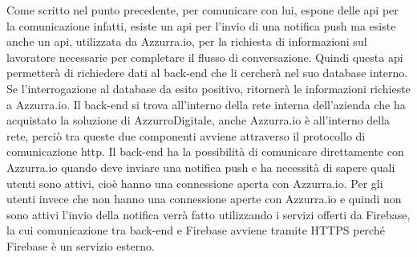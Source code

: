 \begin{trivlist}
	Come scritto nel punto precedente, per comunicare con lui, espone delle \gls{api}\ap{[g]} per la comunicazione infatti, esiste un \gls{api}\ap{[g]} per l'invio di una \gls{notifica push}\ap{[g]} ma esiste anche un \gls{api}\ap{[g]}, utilizzata da Azzurra.io, per la richiesta di informazioni sul lavoratore necessarie per completare il flusso di conversazione. Quindi questa \gls{api}\ap{[g]} permetterà di richiedere dati al back-end che li cercherà nel suo database interno. Se l'interrogazione al database da esito positivo, ritornerà le informazioni richieste a Azzurra.io. Il back-end si trova all'interno della rete interna dell'azienda che ha acquistato la soluzione di AzzurroDigitale, anche Azzurra.io è all'interno della rete, perciò tra queste due componenti avviene attraverso il protocollo di comunicazione \gls{http}\ap{[g]}\glsfirstoccur. Il back-end ha la possibilità di comunicare direttamente con Azzurra.io quando deve inviare una \gls{notifica push}\ap{[g]} e ha necessità di sapere quali utenti sono attivi, cioè hanno una connessione aperta con Azzurra.io. Per gli utenti invece che non hanno una connessione aperte con Azzurra.io e quindi non sono attivi l'invio della notifica verrà fatto utilizzando i servizi offerti da Firebase, la cui comunicazione tra back-end e Firebase avviene tramite HTTPS perché Firebase è un servizio esterno.\\
	

\end{trivlist}
